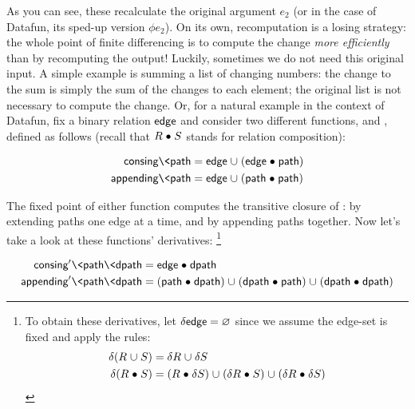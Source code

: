\noindent
As you can see, these recalculate the original argument $e_2$ (or in the case of Datafun, its sped-up version $\phi e_2$).
%
%
On its own, recomputation is a losing strategy: the whole point of finite
differencing is to compute the change \emph{more efficiently} than by
recomputing the output!
%
Luckily, sometimes we do not need this original input.
%
A simple example is summing a list of changing numbers: the change to the sum is simply the sum of the changes to each element; the original list is not necessary to compute the change.
%
Or, for a natural example in the context of Datafun, fix a binary relation $\text{\sffamily edge}$ and consider two different functions,  and , defined as follows (recall that $R \mathrel{\bullet} S$ stands for relation composition):

\begin{align*}
  \name{consing} \<\name{path}
  &= \name{edge} \cup (\name{edge} \relcomp \name{path})
  \\
  \name{appending} \<\name{path}
  &= \name{edge} \cup (\name{path} \relcomp \name{path})
\end{align*}

\noindent
The fixed point of either function computes the transitive closure of
:  by extending paths one edge at a time, and
 by appending paths together. Now let's take a look at these
functions' derivatives:%
%
\footnote{To obtain these derivatives, let $\delta \text{\sffamily edge} = \varnothing$
  since we assume the edge-set is fixed and apply the rules:
  \begin{align*}
  \delta(R \cup S) &= \delta R \cup \delta S
  \\
  \delta(R \relcomp S) &=
  (R \relcomp \delta S) \cup (\delta R \relcomp S) \cup (\delta R \relcomp \delta S)
  \end{align*}}

\begin{align*}
  \name{consing}' \<\name{path} \<\name{dpath}
  &= \name{edge} \relcomp \name{dpath}
  \\
  \name{appending}' \<\name{path} \<\name{dpath}
  &= (\name{path} \relcomp \name{dpath})
  \cup (\name{dpath} \relcomp \name{path})
  \cup (\name{dpath} \relcomp \name{dpath})
\end{align*}

